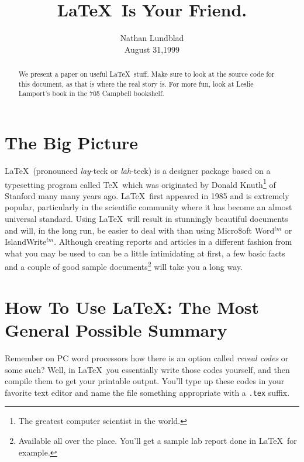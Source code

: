 \documentclass[11pt]{article}
\begin{document}
\title{\LaTeX\ Is Your Friend.}

\author{Nathan Lundblad  \\ August 31,1999}

\maketitle
\begin{abstract} We present a paper on useful \LaTeX\ stuff.  Make sure
to look at the source code for this document, as that is where the real
story is.  For more fun, look at Leslie Lamport's book in the 705
Campbell bookshelf.  \end{abstract}

\section{The Big Picture}\label{bigpicsec} %

        \LaTeX\ (pronounced {\it lay}-teck or {\it lah}-teck) is a
designer package based on a typesetting program called \TeX\, which was
originated by Donald Knuth\footnote{The greatest computer scientist in
the world.} of Stanford many many years ago.  \LaTeX\ first appeared in
1985 and is extremely popular, particularly in the scientific community
where it has become an almost universal standard.  Using \LaTeX\ will
result in stunningly beautiful documents and will, in the long run, be
easier to deal with than using Micro\$oft Word$^{tm}$ or
IslandWrite$^{tm}$.  Although creating reports and articles in a
different fashion from what you may be used to can be a little
intimidating at first, a few basic facts and a couple of good sample
documents\footnote{Available all over the place.  You'll get a sample
lab report done in \LaTeX\, for example.  } will take you a long way. 

\section{How To Use \LaTeX: The Most General Possible Summary}
\label{howtosec}

        Remember on PC word processors how there is an option called
{\it reveal codes} or some such? Well, in \LaTeX\ you essentially write
those codes yourself, and then compile them to get your printable
output.  You'll type up these codes in your favorite text editor and
name the file something appropriate with a \verb&.tex& suffix.
\end{document}
